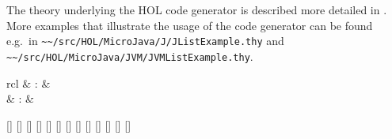 \begin{isabellebody}
\endisatagML
{\isafoldML}%
%
\isadelimML
%
\endisadelimML
%
\begin{isamarkuptext}%
\medskip The theory underlying the HOL code generator is described
  more detailed in \cite{Berghofer-Nipkow:2002}. More examples that
  illustrate the usage of the code generator can be found e.g.\ in
  \verb|~~/src/HOL/MicroJava/J/JListExample.thy| and \verb|~~/src/HOL/MicroJava/JVM/JVMListExample.thy|.%
\end{isamarkuptext}%
\isamarkuptrue%
%
\isamarkuptrue%
%
\begin{isamarkuptext}%
\begin{matharray}{rcl}
    \hypertarget{command.HOL.specification}{\hyperlink{command.HOL.specification}{\mbox{}}} & : &  \\
    \hypertarget{command.HOL.ax-specification}{\hyperlink{command.HOL.ax-specification}{\mbox{}}} & : &  \\
  \end{matharray}

  \begin{railoutput}
\rail@bar
{}[]
[]
\rail@endbar
{}[]
\rail@plus
{}[]
\rail@endplus
{}[]
\rail@plus
\rail@bar
{}
[]
\rail@endbar
{}[]
\rail@endplus
\rail@end
{}
\rail@bar
{}
[]
[]
\rail@endbar
{}[]
[]
[]
\rail@bar
{}
[]
\rail@endbar
\rail@end
\end{railoutput}



\end{isamarkuptext}
\end{isabellebody}
